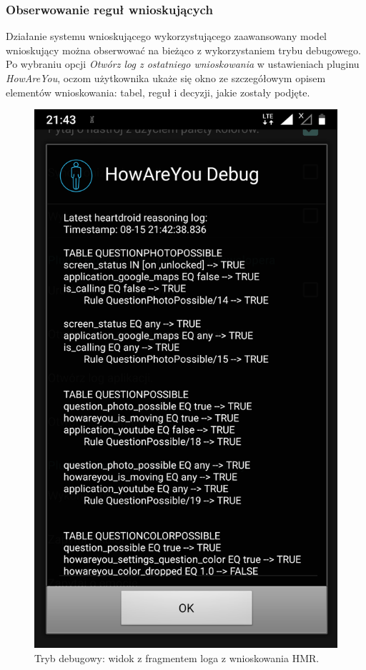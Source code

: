 \subsubsection{Obserwowanie reguł wnioskujących}

Działanie systemu wnioskującego wykorzystującego zaawansowany model wnioskujący można obserwować na bieżąco z wykorzystaniem trybu debugowego. Po wybraniu opcji \textit{Otwórz log z ostatniego wnioskowania} w ustawieniach pluginu \textit{HowAreYou}, oczom użytkownika ukaże się okno ze szczegółowym opisem elementów wnioskowania: tabel, reguł i decyzji, jakie zostały podjęte.

\begin{figure}[H]
	\centering
	\includegraphics[scale=0.15]{rozdzial4/HMR_screenshots_A.png}
	\caption{Tryb debugowy: widok z fragmentem loga z wnioskowania HMR.}
\end{figure}



